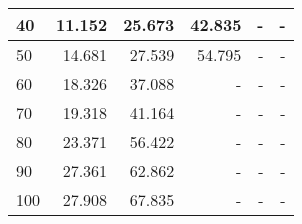 \begin{table}[h]
\begin{tabular}{|l|r|r|r|r|r|}
40                               & 11.152          & 25.673           & 42.835           & -                & -                \\ \hline
50                               & 14.681          & 27.539           & 54.795           & -                & -                \\ \hline
60                               & 18.326          & 37.088           & -                & -                & -                \\ \hline
70                               & 19.318          & 41.164           & -                & -                & -                \\ \hline
80                               & 23.371          & 56.422           & -                & -                & -                \\ \hline
90                               & 27.361          & 62.862           & -                & -                & -                \\ \hline
100                              & 27.908          & 67.835           & -                & -                & -                \\ \hline
\end{tabular}
\end{table}

